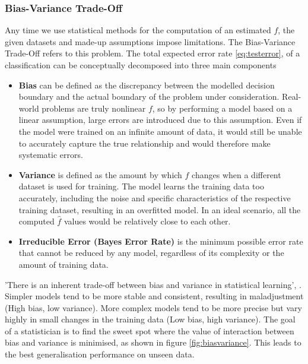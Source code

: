 \documentclass[12pt,a4paper,titlepage]{article}
\numberwithin{equation}{section}
\numberwithin{table}{section}
\numberwithin{figure}{section}
\begin{document}
    \subsubsection{Bias-Variance Trade-Off}\label{biasvariancetradeoff}
    Any time we use statistical methods for the computation of an estimated $f$, the given datasets and made-up assumptions impose limitations. The Bias-Variance Trade-Off refers to this problem.
    The total expected error rate \ref{eq:testerror}, of a classification can be conceptually decomposed into three main components
        \begin{itemize}
            \item\label{Bias} \textbf{Bias} can be defined as the discrepancy between the modelled decision boundary and the actual boundary of the problem under consideration. Real-world problems are truly nonlinear $f$, so by performing a model based on a linear assumption, large errors are introduced due to this assumption. Even if the model were trained on an infinite amount of data, it would still be unable to accurately capture the true relationship and would therefore make systematic errors.
            \item\label{Variance} \textbf{Variance} is  defined as the amount by which $\hat{f}$ changes when a different dataset is used for training. The model learns the training data too accurately, including the noise and specific characteristics of the respective training dataset, resulting in an overfitted model. In an ideal scenario, all the computed $\hat{f}$ values would be relatively close to each other.
            \item\label{Irreducible Error (Bayes Error Rate)} \textbf{Irreducible Error (Bayes Error Rate)} is the minimum possible error rate that cannot be reduced by any model, regardless of its complexity or the amount of training data.
        \end{itemize}
         'There is an inherent trade-off between bias and variance in statistical learning', \cite[p.33]{ISLR}. Simpler models tend to be more stable and consistent, resulting in maladjustment (High bias, low variance). More complex models tend to be more precise but vary highly in small changes in the training data (Low bias, high variance).
        The goal of a statistician is to find the sweet spot where the value of interaction between bias and variance is minimised, as shown in figure \ref{fig:biasvariance}. This leads to the best generalisation performance on unseen data.
        
\end{document}
